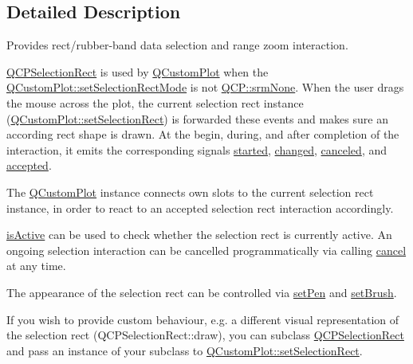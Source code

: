 \subsection{Detailed Description}
Provides rect/rubber-\/band data selection and range zoom interaction. 

\hyperlink{class_q_c_p_selection_rect}{Q\+C\+P\+Selection\+Rect} is used by \hyperlink{class_q_custom_plot}{Q\+Custom\+Plot} when the \hyperlink{class_q_custom_plot_a810ef958ebe84db661c7288b526c0deb}{Q\+Custom\+Plot\+::set\+Selection\+Rect\+Mode} is not \hyperlink{namespace_q_c_p_ac9aa4d6d81ac76b094f9af9ad2d3aacfa894e973fdf7efc6174a9de50babb19fd}{Q\+C\+P\+::srm\+None}. When the user drags the mouse across the plot, the current selection rect instance (\hyperlink{class_q_custom_plot_a0c09f96df15faa4799ad7051bb16cf33}{Q\+Custom\+Plot\+::set\+Selection\+Rect}) is forwarded these events and makes sure an according rect shape is drawn. At the begin, during, and after completion of the interaction, it emits the corresponding signals \hyperlink{class_q_c_p_selection_rect_a7b7162d19f4f2174d3644ff1a5d335aa}{started}, \hyperlink{class_q_c_p_selection_rect_a1bab11026bca52740c2e6682623e6964}{changed}, \hyperlink{class_q_c_p_selection_rect_aeb82009393c90130102dccf36477b906}{canceled}, and \hyperlink{class_q_c_p_selection_rect_a15a43542e1f7b953a44c260b419e6d2c}{accepted}.

The \hyperlink{class_q_custom_plot}{Q\+Custom\+Plot} instance connects own slots to the current selection rect instance, in order to react to an accepted selection rect interaction accordingly.

\hyperlink{class_q_c_p_selection_rect_ad27c1569c6ea8fa48e24b81e2a302df3}{is\+Active} can be used to check whether the selection rect is currently active. An ongoing selection interaction can be cancelled programmatically via calling \hyperlink{class_q_c_p_selection_rect_af67bc58f4f5ce9a4dc420b9c42de235a}{cancel} at any time.

The appearance of the selection rect can be controlled via \hyperlink{class_q_c_p_selection_rect_ada20b7fb1b2dcbe50523262636b06963}{set\+Pen} and \hyperlink{class_q_c_p_selection_rect_ab0c66f1484418782efa01f4153611080}{set\+Brush}.

If you wish to provide custom behaviour, e.\+g. a different visual representation of the selection rect (Q\+C\+P\+Selection\+Rect\+::draw), you can subclass \hyperlink{class_q_c_p_selection_rect}{Q\+C\+P\+Selection\+Rect} and pass an instance of your subclass to \hyperlink{class_q_custom_plot_a0c09f96df15faa4799ad7051bb16cf33}{Q\+Custom\+Plot\+::set\+Selection\+Rect}. 

